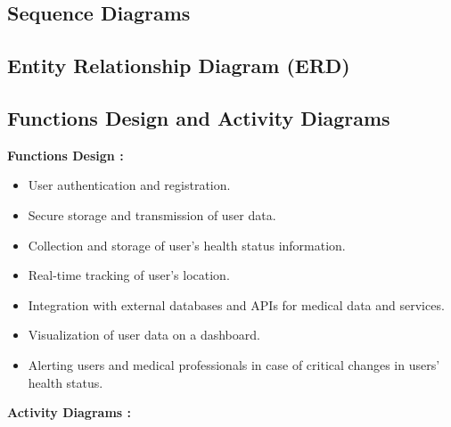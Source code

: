 \documentclass[12pt]{article}
\begin{document}
			\subsection{Sequence Diagrams}
			\subsection{Entity Relationship Diagram (ERD)}
			\subsection{Functions Design and Activity Diagrams}
			\textbf{Functions Design :}
			\begin{itemize}
				\item User authentication and registration.
				\item Secure storage and transmission of user data.
				\item Collection and storage of user's health status information.
				\item Real-time tracking of user's location.
				\item Integration with external databases and APIs for medical data and services.
				\item Visualization of user data on a dashboard.
				\item Alerting users and medical professionals in case of critical changes in users’ health status.
				
			\end{itemize}
			\textbf{Activity Diagrams :}
\end{document}
